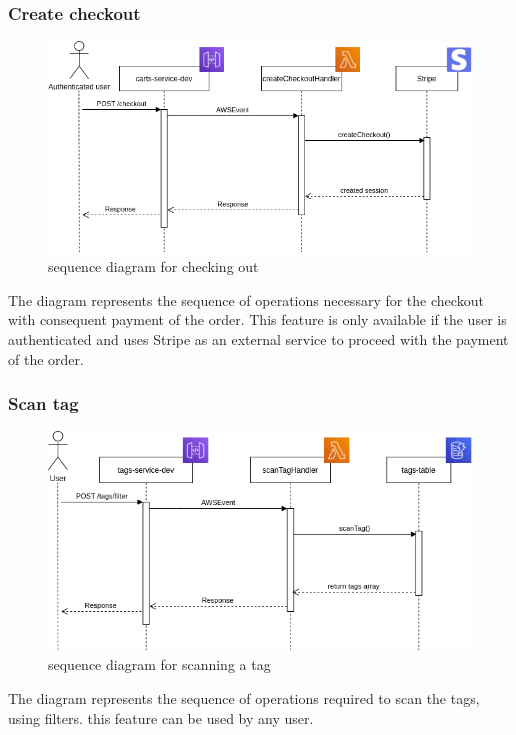 \subsubsection{Create checkout}
\begin{figure}[!h]
    \vspace{5px}
    \includegraphics[scale=0.5]{../../../../Images/Diagrammi/maintainerManual/createCheckoutSequence.png}
    \centering
    \caption{sequence diagram for checking out}
\end{figure}
The diagram represents the sequence of operations necessary for the checkout with consequent payment of the order. This feature is only available if the user is authenticated and uses Stripe as an external service to proceed with the payment of the order.
\pagebreak
\subsubsection{Scan tag}
\begin{figure}[!h]
    \vspace{5px}
    \includegraphics[scale=0.5]{../../../../Images/Diagrammi/maintainerManual/scanTagSequence.png}
    \centering
    \caption{sequence diagram for scanning a tag}
\end{figure}
The diagram represents the sequence of operations required to scan the tags, using filters. this feature can be used by any user.
\pagebreak
